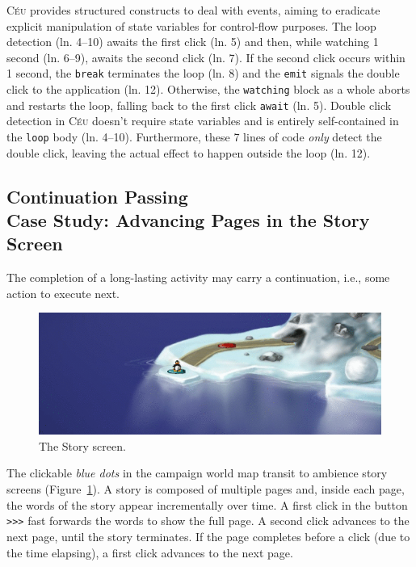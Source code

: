 \documentclass{vgtc}                          %
\newcommand{\CEU}{\textsc{C\'{e}u}\xspace}
\newcommand{\code}[1] {{\small{\texttt{#1}}}}
\begin{document}
\CEU provides structured constructs to deal with events, aiming to eradicate
explicit manipulation of state variables for control-flow purposes.
%
The loop detection (ln. 4--10) awaits the first click (ln. 5) and then, while
watching 1 second (ln. 6--9), awaits the second click (ln. 7).
If the second click occurs within 1 second, the \code{break} terminates the
loop (ln. 8) and the \code{emit} signals the double click to the application
(ln. 12).
Otherwise, the \code{watching} block as a whole aborts and restarts the loop, 
falling back to the first click \code{await} (ln. 5).
%
Double click detection in \CEU doesn't require state variables and is entirely
self-contained in the \code{loop} body (ln. 4--10).
Furthermore, these 7 lines of code \emph{only} detect the double click, leaving
the actual effect to happen outside the loop (ln. 12).

\subsection{Continuation Passing \\ Case Study: Advancing Pages in the Story Screen}

The completion of a long-lasting activity may carry a continuation, i.e., some
action to execute next.

\begin{figure}
\centering
\includegraphics[width=\columnwidth]{story-anim}
\caption{The Story screen.
\label{fig.story}
}
\end{figure}

The clickable \emph{blue dots} in the campaign world map transit to ambience
story screens (Figure~\ref{fig.story}).
A story is composed of multiple pages and, inside each page, the words of the
story appear incrementally over time.
A first click in the button \code{>>>} fast forwards the words to show the full 
page.
A second click advances to the next page, until the story terminates.
If the page completes before a click (due to the time elapsing), a first click 
advances to the next page.
\end{document}

